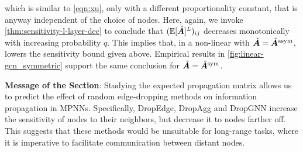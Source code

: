which is similar to \autoref{eqn:xu}, only with a different proportionality constant, that is anyway independent of the choice of nodes. Here, again, we invoke \autoref{thm:sensitivity-l-layer-dec} to conclude that $(\mathbb{E}[\hat{\bm{A}}]^L)_{ij}$ decreases monotonically with increasing  probability $q$. This implies that, in a non-linear  with $\hat{\bm{A}} = \hat{\bm{A}}^{\text{asym}}$,  lowers the sensitivity bound given above. Empirical results in \autoref{fig:linear-gcn_symmetric} support the same conclusion for $\hat{\bm{A}} = \hat{\bm{A}}^{\text{sym}}$.

\begin{tcolorbox}[boxsep=0mm,left=2.5mm,right=2.5mm]
     \textbf{Message of the Section}: Studying the expected propagation matrix allows us to predict the effect of random edge-dropping methods on information propagation in MPNNs. Specifically, DropEdge, DropAgg and DropGNN increase the sensitivity of nodes to their neighbors, but decrease it to nodes farther off. This suggests that these methods would be unsuitable for long-range tasks, where it is imperative to facilitate communication between distant nodes.
\end{tcolorbox}